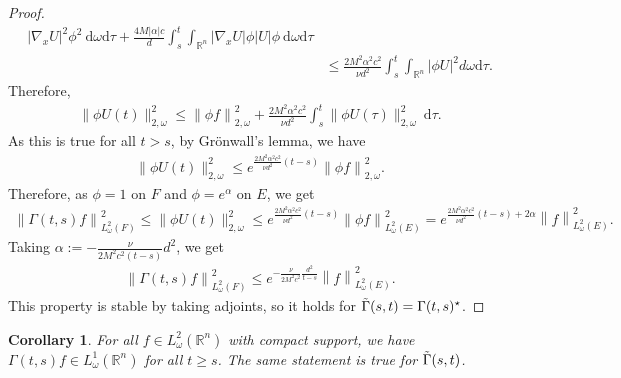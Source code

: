 \documentclass[12pt, letterpaper]{amsart}
\newtheorem{cor}[thm]{Corollary}
\theoremstyle{definition}
\theoremstyle{remark}
\numberwithin{equation}{section}
\begin{document}
\begin{proof}
\begin{align*}
       | \nabla_x U  |^2 \phi^2 \ \mathrm d \omega \mathrm d \tau + \frac{4M | \alpha |c}{d} \int_{s}^{t} \int_{\mathbb{R}^n}  | \nabla_x U  | \phi \left | U \right |\phi \ \mathrm d \omega \mathrm d \tau
      \\& \leq \frac{2M^2  \alpha^2 c^2}{\nu d^2} \int_{s}^{t} \int_{\mathbb{R}^n} |\phi U  |^2  d \omega \mathrm d \tau.
\end{align*}
Therefore,  
\begin{align*}
  \|\phi U(t)   \|^2_{2,\omega} \leq \left \| \phi f  \right \|^2_{2,\omega} + \frac{2M^2\alpha^2 c^2}{\nu d^2} \int_{s}^{t}   \| \phi U(\tau)  \|^2_{2,\omega} \ \mathrm{d}\tau.
\end{align*}
As this is true for all $t>s$, by Grönwall's lemma, we have
\begin{align*}
       \|\phi U(t)  \|^2_{2,\omega} \leq e^{\frac{2M^2\alpha^2 c^2}{\nu d^2}(t-s)}\left \| \phi f  \right \|^2_{2,\omega}.
\end{align*}
Therefore, as $\phi=1$ on $F$ and $\phi=e^{\alpha}$ on $E$, we get
\begin{align*}
    \left\| \Gamma(t,s)f  \right\|^2_{L^2_\omega(F)} \leq   \|\phi U(t)  \|^2_{2,\omega} \leq e^{\frac{2M^2\alpha^2 c^2}{\nu d^2}(t-s)} \left\| \phi f \right\|^2_{L^2_\omega(E)}=e^{\frac{2M^2\alpha^2 c^2}{\nu d^2}(t-s)+2\alpha} \left\| f \right\|^2_{L^2_\omega(E)}.
\end{align*}
Taking $\alpha := - \frac{\nu}{2 M^2 c^2 (t-s)} d^2$, we get
\begin{align*}
    \left\| \Gamma(t,s)f  \right\|^2_{L^2_\omega(F)} \leq  e^{-\frac{\nu}{2M^2 c^2} \frac{d^2}{t-s}} \left\|f \right\|^2_{L^2_\omega(E)}.
\end{align*}
This property is stable by taking adjoints, so it holds for $\Tilde{\Gamma}(s,t)=\Gamma(t,s)^\star$.
\end{proof}
\begin{cor}\label{cor:L1}
    For all $f \in L^2_\omega(\mathbb{R}^n)$ with compact support, we have $\Gamma(t,s)f \in L^1_\omega(\mathbb{R}^n)$ for all $t\ge s$. The same statement is true for $\Tilde{\Gamma}(s,t)$.
\end{cor}
\end{document}
